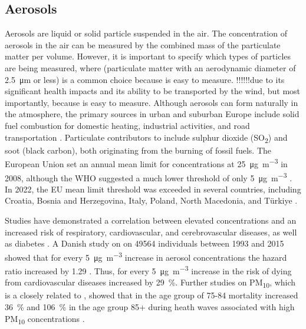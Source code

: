 \subsection{Aerosols}
Aerosols are liquid or solid particle suspended in the air. The concentration of aerosols in the air can be measured by the combined mass of the particulate matter per volume. However, it is important to specify which types of particles are being measured, where \PM(particulate matter with an aerodynamic diameter of \SI{2.5}{\micro\meter} or less) is a common choice because \PM is easy to measure. !!!!!!due to its significant health impacts and its ability to be transported by the wind, but most importantly, because \PM is easy to measure. Although aerosols can form naturally in the atmosphere, the primary sources in urban and suburban Europe include solid fuel combustion for domestic heating, industrial activities, and road transportation \cite{europeanenvironmentagencyEuropesAirQuality2024}. Particulate contributors to \PM include sulphur dioxide (SO\textsubscript{2}) and soot (black carbon), both originating from the burning of fossil fuels. The European Union set an annual mean limit for \PM concentrations at \SI{25}{\micro\gram\per\cubic\meter} in 2008, although the WHO suggested a much lower threshold of only \SI{5}{\micro\gram\per\cubic\meter} \cite{europeanenvironmentagencyEuropesAirQuality2024}. In 2022, the EU mean limit threshold was exceeded in several countries, including Croatia, Bosnia and Herzegovina, Italy, Poland, North Macedonia, and Türkiye \cite{europeanenvironmentagencyEuropesAirQuality2024}. 

Studies have demonstrated a correlation between elevated \PM concentrations and an increased risk of respiratory, cardiovascular, and cerebrovascular diseases, as well as diabetes \cite{sharmaHealthEffectsAssociated2020}. A Danish study on on \SI{49564}{} individuals between 1993 and 2015 showed that for every \SI{5}{\micro\gram\per
\m\cubed} increase in aerosol concentrations the hazard ratio increased by 1.29 \cite{hvidtfeldtLongtermResidentialExposure2019}. Thus, for every \SI{5}{\micro\gram\per
\m\cubed} increase in \PM the risk of dying from cardiovascular diseases increased by \SI{29}{\%}. Further studies on PM\textsubscript{10}, which is a closely related to \PM, showed that in the age group of 75-84 mortality increased \SI{36}{\%} and \SI{106}{\%} in the age group 85+ during heath waves associated with high PM\textsubscript{10} concentrations \cite{analitisEffectsHeatWaves2014}.  


